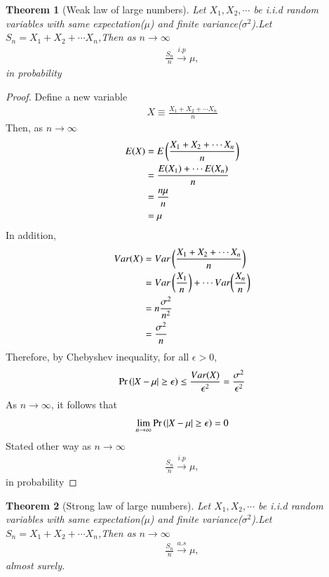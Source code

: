 \documentclass[journal,12pt,twocolumn]{IEEEtran}
\newtheorem{theorem}{Theorem}[section]
\begin{document}
\begin{theorem}[Weak law of large numbers]
\label{theorem}
Let $X_1,X_2,\cdots $ be i.i.d random variables with same expectation($\mu$) and finite variance($\sigma^2$).Let $S_{n}=X_1+X_2+\cdots X_n$,Then as $n \to \infty$
\begin{align}
    \frac{S_n}{n} \xrightarrow{i.p}  \mu,
\end{align}
in probability
\end{theorem}
\begin{proof}
Define a new variable
\begin{align}
    X \equiv \frac{X_1+X_2+\cdots X_n}{n}
\end{align}
Then, as $n \to \infty$
\begin{align}
    E(X)&=E\left(\frac{X_1+X_2+\cdots X_n}{n}\right)\\
    &=\frac{E(X_1)+\cdots E(X_n)}{n}\\
    &=\frac{n \mu}{n}\\
    &=\mu
\end{align}
In addition,
\begin{align}
    Var(X)&=Var\left(\frac{X_1+X_2+\cdots X_n}{n}\right)\\
    &=Var\left(\frac{X_1}{n}\right)+\cdots Var{\left(\frac{X_n}{n}\right)}\\
    &=n\frac{\sigma^2}{n^2}\\
    &=\frac{\sigma^2}{n}
\end{align}
Therefore, by Chebyshev inequality, for all $\epsilon>0$,
\begin{align}
   \Pr\left(|X-\mu| \geq \epsilon\right) \leq \frac{Var(X)}{\epsilon^2}=\frac{\sigma^2}{\epsilon^2}   
\end{align}
As $n \to \infty$, it follows that
\begin{align}
    \lim_{n \to \infty} \Pr\left(|X-\mu| \geq \epsilon\right)=0
\end{align}
Stated other way as $n \to \infty$
\begin{align}
    \frac{S_n}{n} \xrightarrow{i.p}  \mu,
\end{align}
in probability
\end{proof}


 \begin{theorem}[Strong law of large numbers]
\label{theorem1}
Let $X_1,X_2,\cdots $ be i.i.d random variables with same expectation($\mu$) and finite variance($\sigma^2$).Let $S_{n}=X_1+X_2+\cdots X_n$,Then as $n \to \infty$
\begin{align}
    \frac{S_n}{n} \xrightarrow{a.s}  \mu,
\end{align}
almost surely.
\end{theorem}
\end{document}
